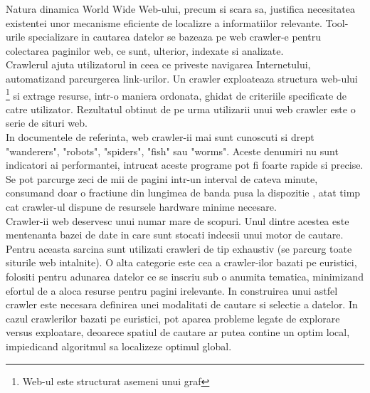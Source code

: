 Natura dinamica World Wide Web-ului, precum si scara sa, justifica necesitatea existentei unor mecanisme eficiente de localizre a informatiilor relevante. Tool-urile specializare in cautarea datelor se bazeaza pe web crawler-e pentru colectarea paginilor web, ce sunt, ulterior, indexate si analizate.
\\ 

Crawlerul ajuta utilizatorul in ceea ce priveste navigarea Internetului, automatizand parcurgerea link-urilor. Un crawler exploateaza structura web-ului \footnote{Web-ul este structurat asemeni unui graf} si extrage resurse, intr-o maniera ordonata, ghidat de criteriile specificate de catre utilizator. Rezultatul obtinut de pe urma utilizarii unui web crawler este o serie de situri web.
\\

In documentele de referinta, web crawler-ii mai sunt cunoscuti si drept "wanderers",  "robots", "spiders", "fish" sau "worms". Aceste denumiri nu sunt indicatori ai performantei, intrucat aceste programe pot fi foarte rapide si precise. Se pot parcurge zeci de mii de pagini intr-un interval de cateva minute, consumand doar o fractiune din lungimea de banda pusa la dispozitie \cite{GautamPadminiFilippo}, atat timp cat crawler-ul dispune de resursele hardware minime necesare.
\\ 

Crawler-ii web deservesc unui numar mare de scopuri. Unul dintre acestea este mentenanta bazei de date in care sunt stocati indecsii unui motor de cautare. Pentru aceasta sarcina sunt utilizati crawleri de tip exhaustiv (se parcurg toate siturile web intalnite). O alta categorie este cea a crawler-ilor bazati pe euristici, folositi pentru adunarea datelor ce se inscriu sub o anumita tematica, minimizand efortul de a aloca resurse pentru pagini irelevante. In construirea unui astfel crawler este necesara definirea unei modalitati de cautare si selectie a datelor. In cazul crawlerilor bazati pe euristici, pot aparea probleme legate de explorare versus exploatare, deoarece spatiul de cautare ar putea contine un optim local, impiedicand algoritmul sa localizeze optimul global.\cite{PantSrinivasanMenczer} 
\\
